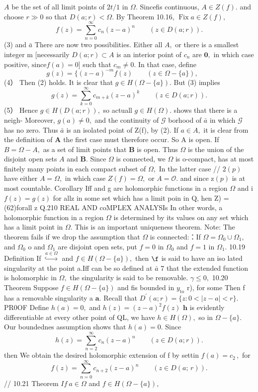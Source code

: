 $\scriptstyle A$ be the set of all limit points of $\scriptstyle{2t/1}$ in $\Omega.$ Sincefis continuous, $A\in Z(f).$ and choose $\scriptstyle r\gg0$ so that $D(a;r)<\Omega.$ By Theorem 10.16, $\operatorname{Fix}a\in Z(f),$ $$ f(z)=\sum_{n=0}^{\infty}c_{n}(z-a)^{n}\qquad(z\in D(a;r)). $$ (3) and $\bar{a}$ There are now two possibilities. Either all $A,$ or there is a smallest integer m [necessarily $D(a;r)\subset A$ is an interior point of $\textstyle c_{n}$ are ${\boldsymbol{0}},$ in which case positive, $\mathrm{since}f(a)=0]$ such that $c_{m}\neq0.$ In that case, define $$ g(z)= \{(z-a)^{-m}f(z)\qquad(z\in\Omega-\{a\}),\qquad $$ (4） Then (2) holds. It is clear that $g\in H(\Omega-\{a\}).$ But (3) implies $$ g(z)=\sum_{k=0}^{\infty}c_{m+k}(z-a)^{k}\qquad(z\in D(a;r)). $$ (5） Hence $g\in H(D(a;r)),$ so actuall $g\in H(\Omega).$ shows that there is a neigh- Moreover, $g(a)\neq0,$ and the continuity of $\scriptstyle{\mathcal{G}}$ borhood of $\bar{a}$ in which $\scriptstyle{\mathcal{G}}$ has no zero. Thus $\bar{a}$ is an isolated point of Z(f), by (2). If $a\in A,$ it is clear from the definition of ${\boldsymbol{A}}$ the first case must therefore occur. So A is open. If $B=\Omega-A,$ as a set of limit points that $\boldsymbol{B}$ is open. Thus $\Omega$ is the union of the disjoint open sets $\scriptstyle A$ and ${\boldsymbol{B}}.$ Since $\Omega$ is connected, we $\Omega$ is o-compact, has at most finitely many points in each compact subset of $\Omega,$ In the latter case // $\scriptstyle2(p)$ have either $A=\Omega,$ in which case $Z(f)=\Omega,$ or $A={\mathcal{O}}.$ and since $\mathrm{z}(p)$ is at most countable. Corollary Iff and g are holomorphic functions in a region $\Omega$ and i $f(z)=g(z)$ for allz in some set which has a limit poin in Q, hen Z) = (62)forall z Q.210 REAL AND coMPLEX ANALYSIs In other words, a holomorphic function in a region $\Omega$ is determined by its values on any set which has a limit point in $\Omega.$ This is an important uniqueness theorem. Note: The theorem fails if we drop the assumption that $\Omega$ is connected:：If $\Omega=\Omega_{0}\cup\Omega_{1},$ and $\Omega_{0}$ o and $\Omega_{1}$ are disjoint open sets, put $f=0$ in $\Omega_{0}$ and $f=1$ in $\Omega_{1}.$ 10.19 Definition If $\overset{a\in\Omega}{\hookrightarrow}$ and $f\in H(\Omega-\{a\}),$ then $\boldsymbol{\f}$ is said to have an iso lated singularity at the point a.Iff can be so defined at $\bar{a}$ 7 that the extended function is holomorphic in $\Omega,$ the singularity is said to be removable. $\scriptstyle\gamma\leq0,$ 10.20 Theorem Suppose $f\in H(\Omega-\{a\})$ and fis bounded in $y_{\mathrm{to}}$ r), for some Then f has a removable singularity a ${\boldsymbol{a}}.$ Recall that $D^{\prime}(a;r)=\{z\colon0<|z-a|<r\}.$ PR0OF Define $h(a)=0,$ and $h(z)=(z-a)^{2}f(z)$ ${\boldsymbol{h}}$ is evidently differentiable at every other point of QL, we have $h\in H(\Omega),$ so in $\Omega-\{a\}.$ Our boundednes assumption shows that $h(a)=0.$ Since $$ h(z)=\sum_{n=2}^{\infty}c_{n}(z-a)^{n}\qquad(z\in D(a;r)). $$ then We obtain the desired holomorphic extension of f by settin $f(a)=c_{2}\,,$ for $$ f(z)=\sum_{n=0}^{\infty}c_{n+2}(z-a)^{n}\qquad(z\in D(a;\,r)). $$ // 10.21 Theorem $I f\ a\in\Omega$ and $f\in H(\Omega-\{a\}),$ 